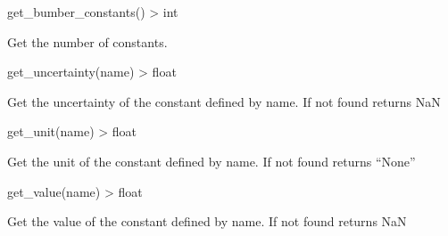 \documentclass[a4paper,10pt,english]{sphinxmanual}
\begin{document}

\begin{fulllineitems}
\label{\detokenize{api/codedoc:pycodata._codata.get_number_constants}}
\pysigstartsignatures
{}
\pysigstopsignatures
\sphinxAtStartPar
get\_bumber\_constants() \textendash{}\textgreater{} int

\sphinxAtStartPar
Get the number of constants.

\end{fulllineitems}


\begin{fulllineitems}
\label{\detokenize{api/codedoc:pycodata._codata.get_uncertainty}}
\pysigstartsignatures
{}
\pysigstopsignatures
\sphinxAtStartPar
get\_uncertainty(name) \textendash{}\textgreater{} float

\sphinxAtStartPar
Get the uncertainty of the constant defined by name. If not found returns NaN

\end{fulllineitems}


\begin{fulllineitems}
\label{\detokenize{api/codedoc:pycodata._codata.get_unit}}
\pysigstartsignatures
{}
\pysigstopsignatures
\sphinxAtStartPar
get\_unit(name) \textendash{}\textgreater{} float

\sphinxAtStartPar
Get the unit of the constant defined by name. If not found returns “None”

\end{fulllineitems}


\begin{fulllineitems}
\label{\detokenize{api/codedoc:pycodata._codata.get_value}}
\pysigstartsignatures
{}
\pysigstopsignatures
\sphinxAtStartPar
get\_value(name) \textendash{}\textgreater{} float

\sphinxAtStartPar
Get the value of the constant defined by name. If not found returns NaN

\end{fulllineitems}
\end{document}
